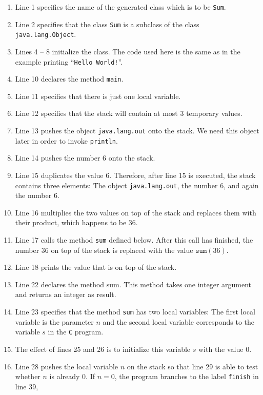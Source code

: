 \begin{enumerate}
\item Line 1 specifies the name of the generated class which is to be \texttt{Sum}.
\item Line 2 specifies that the class \texttt{Sum} is a subclass of the class
      \texttt{java.lang.Object}. 
\item Lines 4 -- 8 initialize the class.  The code used here is the same as in the example printing 
      ``\texttt{Hello World!}''.
\item Line 10 declares the method \texttt{main}.
\item Line 11 specifies that there is just one local variable.
\item Line 12 specifies that the stack will contain at most 3 temporary values.
\item Line 13 pushes the object \texttt{java.lang.out} onto the stack.
      We need this object later in order to invoke \texttt{println}.
\item Line 14 pushes the number 6 onto the stack.
\item Line 15 duplicates the value 6.  Therefore, after line 15 is executed, the stack contains three
      elements: The object \texttt{java.lang.out},  the number 6, and again the number 6.
\item Line 16 multiplies the two values on top of the stack and replaces them with their product,
      which happens to be 36.
\item Line 17 calls the method \texttt{sum} defined below.  After this call has finished, the number 
      36 on top of the stack is replaced with the value $\mathtt{sum}(36)$.
\item Line 18 prints the value that is on top of the stack. 
\item Line 22 declares the method sum.  This method takes one integer argument and returns an
      integer as result. 
\item Line 23 specifies that the method \texttt{sum} has two local variables: The first local
      variable is the parameter $n$ and the second local variable corresponds to the variable $s$ in the
      \texttt{C} program.
\item The effect of lines 25 and 26 is to initialize this variable $s$ with the value $0$.
\item Line 28 pushes the local variable $n$ on the stack so that line 29 is able to test whether $n$
      is already $0$.  If $n = 0$, the program branches to the label \texttt{finish} in line 39,

\end{enumerate}
